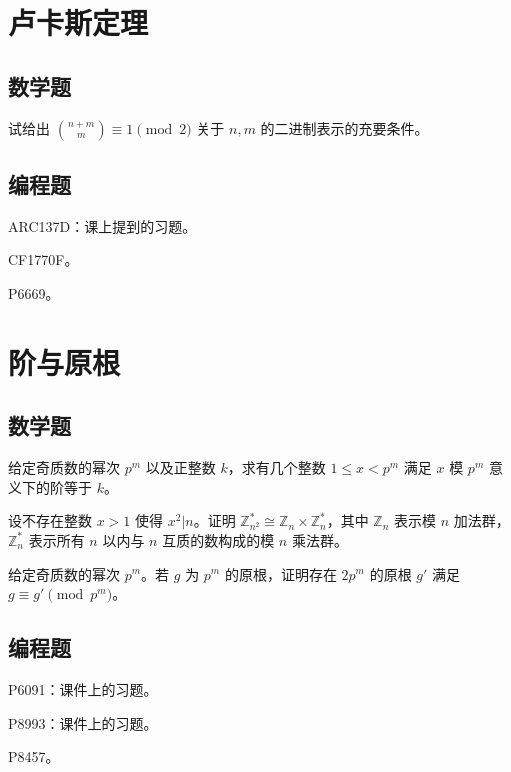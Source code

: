 \documentclass{noithesis}
\theoremstyle{definition}
\def\Z{\mathbb{Z}}
\def\le{\leqslant}
\begin{document}
\section{卢卡斯定理}

\subsection{数学题}

\begin{compactenum}
\item 试给出 $\binom{n+m}m\equiv 1\pmod 2$ 关于 $n,m$ 的二进制表示的充要条件。
\end{compactenum}

\subsection{编程题}

\begin{compactenum}
\item ARC137D：课上提到的习题。
\item CF1770F。
\item P6669。
\end{compactenum}

\section{阶与原根}

\subsection{数学题}

\begin{compactenum}
\item 给定奇质数的幂次 $p^m$ 以及正整数 $k$，求有几个整数 $1\le x<p^m$ 满足 $x$ 模 $p^m$ 意义下的阶等于 $k$。
\item 设不存在整数 $x>1$ 使得 $x^2|n$。证明 $\Z_{n^2}^*\cong \Z_n\times \Z_n^*$，其中 $\Z_n$ 表示模 $n$ 加法群，$\Z_n^*$ 表示所有 $n$ 以内与 $n$ 互质的数构成的模 $n$ 乘法群。
\item 给定奇质数的幂次 $p^m$。若 $g$ 为 $p^m$ 的原根，证明存在 $2p^m$ 的原根 $g'$ 满足 $g\equiv g'\pmod {p^m}$。 
\end{compactenum}

\subsection{编程题}

\begin{compactenum}
\item P6091：课件上的习题。
\item P8993：课件上的习题。
\item P8457。
\end{compactenum}
\end{document}
